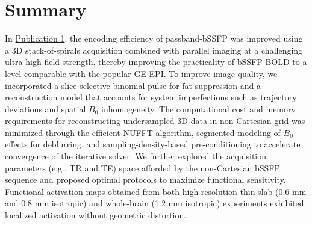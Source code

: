 \newpage
\section{Summary}
In \hyperref[sec:paper1]{Publication 1}, the encoding efficiency of passband-bSSFP was improved using a 3D stack-of-spirals acquisition combined with parallel imaging at a challenging ultra-high field strength, thereby improving the practicality of bSSFP-BOLD to a level comparable with the popular \gls{GE}-\gls{EPI}. To improve image quality, we incorporated a slice-selective binomial pulse for fat suppression and a reconstruction model that accounts for system imperfections such as trajectory deviations and spatial $B_0$ inhomogeneity. The computational cost and memory requirements for reconstructing undersampled 3D data in non-Cartesian grid was minimized through the efficient \gls{NUFFT} algorithm, segmented modeling of $B_0$ effects for deblurring, and sampling-density-based pre-conditioning to accelerate convergence of the iterative solver. We further explored the acquisition parameters (e.g., TR and TE) space afforded by the non-Cartesian bSSFP sequence and proposed optimal protocols to maximize functional sensitivity. Functional activation maps obtained from both high-resolution thin-slab (0.6 mm and 0.8 mm isotropic) and whole-brain (1.2 mm isotropic) experiments exhibited localized activation without geometric distortion. 

